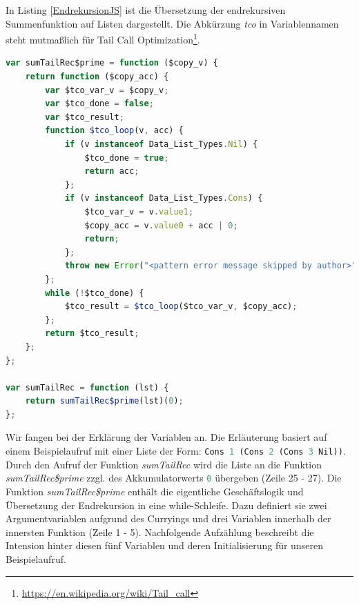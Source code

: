 \documentclass[
12pt,
ngerman,
oneside]
{scrbook} %
\begin{document}
In Listing \ref{EndrekursionJS} ist die Übersetzung der endrekursiven Summenfunktion auf Listen dargestellt. Die Abkürzung \emph{tco} in Variablennamen steht mutmaßlich für \glqq Tail Call Optimization\grqq{}\footnote{\href{https://en.wikipedia.org/wiki/Tail_call}{https://en.wikipedia.org/wiki/Tail_call}}.

\begin{lstlisting}[language=javascript, style=numbered-and-boxed, caption= Übersetzung von Endrekursion nach JavaScript, label=EndrekursionJS]
var sumTailRec$prime = function ($copy_v) {
	return function ($copy_acc) {
		var $tco_var_v = $copy_v;
		var $tco_done = false;
		var $tco_result;
		function $tco_loop(v, acc) {
			if (v instanceof Data_List_Types.Nil) {
				$tco_done = true;
				return acc;
			};
			if (v instanceof Data_List_Types.Cons) {
				$tco_var_v = v.value1;
				$copy_acc = v.value0 + acc | 0;
				return;
			};
			throw new Error("<pattern error message skipped by author>");
		};
		while (!$tco_done) {
			$tco_result = $tco_loop($tco_var_v, $copy_acc);
		};
		return $tco_result;
	};
};

var sumTailRec = function (lst) {
	return sumTailRec$prime(lst)(0);
};
\end{lstlisting}

Wir fangen bei der Erklärung der Variablen an. Die Erläuterung basiert auf einem Beispielaufruf mit einer Liste der Form: \lstinline[language=javascript, columns=fixed]{Cons 1 (Cons 2 (Cons 3 Nil))}. Durch den Aufruf der Funktion \emph{sumTailRec} wird die Liste an die Funktion \emph{sumTailRec\$prime} zzgl. des Akkumulatorwerts \lstinline[language=javascript, columns=fixed]{0} übergeben (Zeile 25 - 27). Die Funktion \emph{sumTailRec\$prime} enthält die eigentliche Geschäftslogik und Übersetzung der Endrekursion in eine while-Schleife. Dazu definiert sie zwei Argumentvariablen aufgrund des Curryings und drei Variablen innerhalb der innersten Funktion (Zeile 1 - 5). Nachfolgende Aufzählung beschreibt die Intension hinter diesen fünf Variablen und deren Initialisierung für unseren Beispielaufruf.
\end{document}
